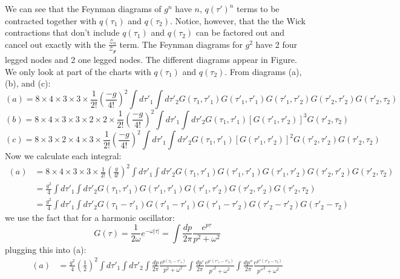 \documentclass{article}
\begin{document}
We can see that the Feynman diagrams of $g^n$ have $n$, $q(\tau')^n$ terms to be contracted together with $q(\tau_1)$  and $q(\tau_2)$.  Notice, however, that the the Wick contractions that don't include $q(\tau_1)$ and $q(\tau_2)$ can be factored out and cancel out exactly with the $\frac{\mathcal{Z}_0}{\mathcal{Z_g}}$ term. The Feynman diagrams for $g^2$ have 2 four legged nodes and 2 one legged nodes. The different diagrams appear in Figure. We only look at part of the charts with  $q(\tau_1)$ and $q(\tau_2)$. From diagrams (a), (b), and (c):
\begin{equation*}
    (a)=8\times 4\times 3 \times 3 \times \frac{1}{2!}(\frac{-g}{4!})^2\int d\tau'_1\int d\tau'_2 G(\tau_1,\tau'_1)G(\tau'_1,\tau'_1)G(\tau'_1,\tau'_2)G(\tau'_2,\tau'_2)G(\tau'_2,\tau_2)
\end{equation*}
\begin{equation*}
   (b)=8\times 4 \times 3\times 3\times 2 \times 2 \times \frac{1}{2!}(\frac{-g}{4!})^2\int d\tau'_1\int d\tau'_2 G(\tau_1,\tau'_1)[G(\tau'_1,\tau'_2)]^3G(\tau'_2,\tau_2)
\end{equation*}
\begin{equation*}
   (c)=8\times 3 \times 2\times 4\times 3 \times \frac{1}{2!}(\frac{-g}{4!})^2\int d\tau'_1\int d\tau'_2 G(\tau_1,\tau'_1)[G(\tau'_1,\tau'_2)]^2G(\tau'_2,\tau'_2)G(\tau'_2,\tau_2)
\end{equation*}
Now we calculate each integral:
\begin{equation*}
\begin{split}
    (a) &=8\times 4\times 3 \times 3 \times \frac{1}{2!}(\frac{g}{4!})^2\int d\tau'_1\int d\tau'_2 G(\tau_1,\tau'_1)G(\tau'_1,\tau'_1)G(\tau'_1,\tau'_2)G(\tau'_2,\tau'_2)G(\tau'_2,\tau_2)\\
    &=  \frac{g^2}{4}\int d\tau'_1\int d\tau'_2 G(\tau_1,\tau'_1)G(\tau'_1,\tau'_1)G(\tau'_1,\tau'_2)G(\tau'_2,\tau'_2)G(\tau'_2,\tau_2)\\
    &=  \frac{g^2}{4}\int d\tau'_1\int d\tau'_2 G(\tau_1 -\tau'_1)G(\tau'_1-\tau'_1)G(\tau'_1-\tau'_2)G(\tau'_2-\tau'_2)G(\tau'_2-\tau_2)
\end{split}
\end{equation*}
we use the fact that for a harmonic oscillator:
\begin{equation}
    G(\tau)=\frac{1}{2\omega}e^{-\omega|\tau|}=\int \frac{dp}{2\pi}\frac{e^{p\tau}}{p^2+\omega^2}
\end{equation}
plugging this into (a):
\begin{equation*}
\begin{split}
    (a) &=  \frac{g^2}{4}(\frac{1}{2})^2\int d\tau'_1\int d\tau'_2 \int \frac{dp}{2\pi}\frac{e^{p(\tau_1-\tau'_1)}}{p^2+\omega^2}\int \frac{dp'}{2\pi}\frac{e^{p'(\tau'_1-\tau'_2)}}{p'^2+\omega^2}\int \frac{dp''}{2\pi}\frac{e^{p''(\tau'_2-\tau_2)}}{p''^2+\omega^2}
\end{split}
\end{equation*}
\end{document}
